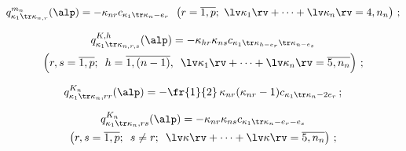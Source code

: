     $$

    q_{\kappa_1\tr \kappa_{n,r}}^{m_n} (\alp) =-\kappa_{nr} 

    c_{\kappa_1\tr \kappa_n-e_r} \enskip 

    \left(r=\overline{1,p};\  \lv\kappa_1\rv+\cdots +\lv \kappa_n\rv = 4, n_n\right)\,;

    $$

    

  \vspace*{-12pt}



\noindent

\begin{multline*}

    q_{\kappa_1\tr \kappa_{n,r,s}}^{K,h} (\alp) =

    -\kappa_{hr} \kappa_{ns} c_{\kappa_1 \tr \kappa_{h-e_r} \tr \kappa_{n-e_{s}}}\\

 \left(r,s =\overline{1,p}; \enskip h=\overline{1,(n-1)},\enskip 

 \lv\kappa_1\rv +\cdots + \lv \kappa_n\rv =\overline{5, n_n}\right)\,;

 \end{multline*}

 

 \vspace*{-9pt}

 

 \noindent

    $$

    q_{\kappa_1\tr \kappa_n, rr}^{K_n} (\alp) = -\fr{1}{2}\,

     \kappa_{nr} (\kappa_{nr} -1) c_{\kappa_1\tr \kappa_n - 2e_r}\,;

     $$

     

   \vspace*{-12pt}



\noindent

\begin{multline*}

    q_{\kappa_1\tr \kappa_n, rs}^{K_n} (\alp) = - \kappa_{nr} \kappa_{ns} 

    c_{\kappa_1\tr \kappa_n - e_r-e_s}\\

\left(r,s=\overline{1,p}; \enskip s\ne r;\enskip \lv \kappa \rv +\cdots +

\lv\kappa\rv =\overline{5, n_n}\right)\,;

\end{multline*}



